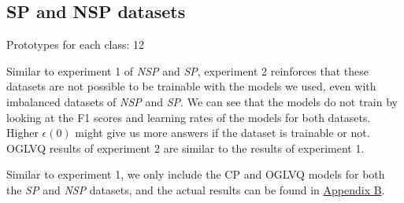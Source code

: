 \subsection{SP and NSP datasets}

Prototypes for each class: 12
\vspace{5pt}

Similar to experiment 1 of \textit{NSP} and \textit{SP}, experiment 2 reinforces that these datasets are not possible to be trainable with the models we used, even with imbalanced datasets of \textit{NSP} and \textit{SP}. We can see that the models do not train by looking at the F1 scores and learning rates of the models for both datasets. Higher $\epsilon(0)$ might give us more answers if the dataset is trainable or not. OGLVQ results of experiment 2 are similar to the results of experiment 1.

Similar to experiment 1, we only include the CP and OGLVQ models for both the \textit{SP} and \textit{NSP} datasets, and the actual results can be found in \hyperlink{appspnsp}{Appendix B}.


